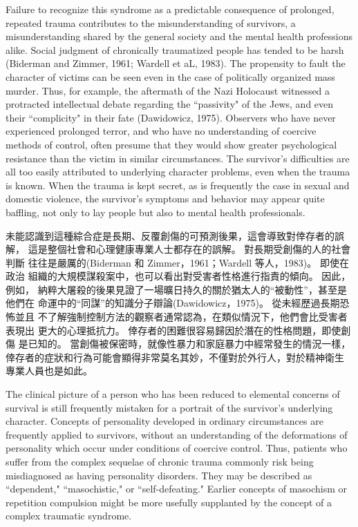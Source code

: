 \documentclass[12pt]{article}
\begin{document}
    Failure to recognize this syndrome as a predictable consequence of
    prolonged, repeated trauma contributes to the misunderstanding of
    survivors, a misunderstanding shared by the general society and the mental
    health professions alike. Social judgment of chronically traumatized people
    has tended to be harsh (Biderman and Zimmer, 1961; Wardell et aL, 1983).
    The propensity to fault the character of victims can be seen even in the
    case of politically organized mass murder. Thus, for example, the aftermath
    of the Nazi Holocaust witnessed a protracted intellectual debate regarding
    the ``passivity" of the Jews, and even their ``complicity" in their fate
    (Dawidowicz, 1975). Observers who have never experienced prolonged terror,
    and who have no understanding of coercive methods of control, often presume
    that they would show greater psychological resistance than the victim in
    similar circumstances. The survivor's difficulties are all too easily
    attributed to underlying character problems, even when the trauma is known.
    When the trauma is kept secret, as is frequently the case in sexual and
    domestic violence, the survivor's symptoms and behavior may appear quite
    baffling, not only to lay people but also to mental health professionals.

    未能認識到這種綜合症是長期、反覆創傷的可預測後果，這會導致對倖存者的誤解，
    這是整個社會和心理健康專業人士都存在的誤解。 對長期受創傷的人的社會判斷
    往往是嚴厲的(Biderman 和 Zimmer，1961；Wardell 等人，1983)。 即使在政治
    組織的大規模謀殺案中，也可以看出對受害者性格進行指責的傾向。 因此，例如，
    納粹大屠殺的後果見證了一場曠日持久的關於猶太人的“被動性”，甚至是他們在
    命運中的“同謀”的知識分子辯論(Dawidowicz，1975)。 從未經歷過長期恐怖並且
    不了解強制控制方法的觀察者通常認為，在類似情況下，他們會比受害者表現出
    更大的心理抵抗力。 倖存者的困難很容易歸因於潛在的性格問題，即使創傷
    是已知的。 當創傷被保密時，就像性暴力和家庭暴力中經常發生的情況一樣，
    倖存者的症狀和行為可能會顯得非常莫名其妙，不僅對於外行人，對於精神衛生
    專業人員也是如此。

    The clinical picture of a person who has been reduced to elemental concerns
    of survival is still frequently mistaken for a portrait of the survivor's
    underlying character. Concepts of personality developed in ordinary
    circumstances are frequently applied to survivors, without an understanding
    of the deformations of personality which occur under conditions of coercive
    control. Thus, patients who suffer from the complex sequelae of chronic
    trauma commonly risk being misdiagnosed as having personality disorders.
    They may be described as ``dependent," ``masochistic," or
    ``self-defeating." Earlier concepts of masochism or repetition compulsion
    might be more usefully supplanted by the concept of a complex traumatic
    syndrome.
\end{document}
